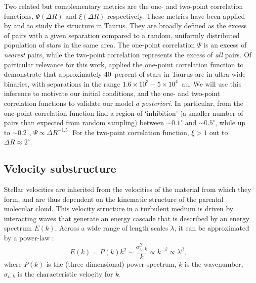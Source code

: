 \documentclass{aa}
\begin{document}
Two related but complementary metrics are the one- and two-point correlation functions, $\Psi(\Delta R) $ and $\xi(\Delta R)$ respectively. These metrics have been applied by \citet{Joncour17} and \citet{Joncour18} to study the structure in Taurus. They are broadly defined as the excess of pairs with a given separation compared to a random, uniformly distributed population of stars in the same area. The one-point correlation $\Psi$ is an excess of \textit{nearest} pairs, while the two-point correlation represents the excess of \textit{all} pairs. Of particular relevance for this work, \citet{Joncour17} applied the one-point correlation function to demonstrate that approximately $40$~percent of stars in Taurus are in ultra-wide binaries, with separations in the range $1.6\times 10^3 - 5\times 10^4$~au. We will use this inference to motivate our initial conditions, and the one- and two-point correlation functions to validate our model \textit{a posteriori}. In particular, from the one-point correlation function \citet{Joncour17} find a region of `inhibition' (a smaller number of pairs than expected from random sampling) between $\sim 0.1^\circ$ and $\sim 0.5^\circ$, while up to $\sim 0.2^\circ$, $\Psi \propto \Delta R^{-1.5}$. For the two-point correlation function, $\xi>1$ out to $\Delta R \approx 2^\circ$.


\subsection{Velocity substructure}
\label{sec:vstruct_taurus}

Stellar velocities are inherited from the velocities of the material from which they form, and are thus dependent on the kinematic structure of the parental molecular cloud. This velocity structure in a turbulent medium is driven by interacting waves that generate an energy cascade that is described by an energy spectrum $E(k)$. Across a wide range of length scales $\lambda$, it can be approximated by a power-law \citep[e.g.][]{Elmegreen04}:
\begin{equation}
\label{eq:energy_spectrum}
    E(k) = P(k)  k^2 \sim \frac{\sigma_{v,k}^2}{k} \propto k^{-\beta} \propto \lambda^\beta,
\end{equation}where $P(k)$ is the (three dimensional) power-spectrum, $k$ is the wavenumber, $\sigma_{v,k}$ is the characteristic velocity for $k$. 
\end{document}

